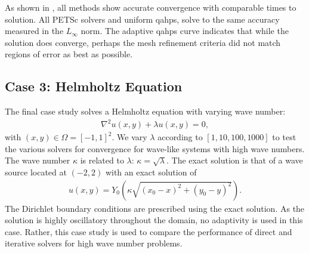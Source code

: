 As shown in , all methods show accurate convergence with comparable times to solution. All PETSc solvers and uniform \gls{qahps}, solve to the same accuracy measured in the $L_{\infty}$ norm. The adaptive \gls{qahps} curve indicates that while the solution does converge, perhaps the mesh refinement criteria did not match regions of error as best as possible.

\subsection{Case 3: Helmholtz Equation}
\label{sub:case3}

The final case study solves a Helmholtz equation with varying wave number:
\begin{align}
    \nabla^2 u(x,y) + \lambda u(x,y) = 0,
\end{align}
with $(x,y) \in \Omega = [-1, 1]^2$. We vary $\lambda$ according to $[1, 10, 100, 1000]$ to test the various solvers for convergence for wave-like systems with high wave numbers. The wave number $\kappa$ is related to $\lambda$: $\kappa = \sqrt{\lambda}$. The exact solution is that of a wave source located at $(-2, 2)$ with an exact solution of
\begin{align}
    u(x,y) = Y_0(\kappa \sqrt{(x_0 - x)^2 + (y_0 - y)^2}).
\end{align}
The Dirichlet boundary conditions are prescribed using the exact solution. As the solution is highly oscillatory throughout the domain, no adaptivity is used in this case. Rather, this case study is used to compare the performance of direct and iterative solvers for high wave number problems.

